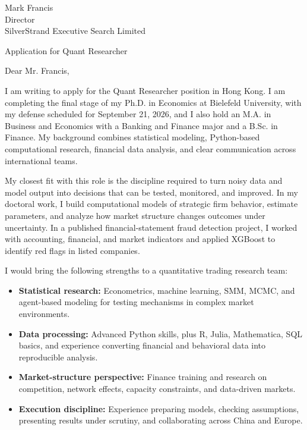\documentclass[11pt]{article}
\begin{document}
\vspace{0.1cm}

\noindent
Mark Francis \\
Director \\
SilverStrand Executive Search Limited \\

\vspace{0.1cm}

\noindent
Application for Quant Researcher \\

\vspace{0.05cm}

\noindent Dear Mr. Francis,

I am writing to apply for the Quant Researcher position in Hong Kong. I am completing the final stage of my Ph.D. in Economics at Bielefeld University, with my defense scheduled for September 21, 2026, and I also hold an M.A. in Business and Economics with a Banking and Finance major and a B.Sc. in Finance. My background combines statistical modeling, Python-based computational research, financial data analysis, and clear communication across international teams.

My closest fit with this role is the discipline required to turn noisy data and model output into decisions that can be tested, monitored, and improved. In my doctoral work, I build computational models of strategic firm behavior, estimate parameters, and analyze how market structure changes outcomes under uncertainty. In a published financial-statement fraud detection project, I worked with accounting, financial, and market indicators and applied XGBoost to identify red flags in listed companies.

I would bring the following strengths to a quantitative trading research team:

\begin{itemize}
    \item \textbf{Statistical research:} Econometrics, machine learning, SMM, MCMC, and agent-based modeling for testing mechanisms in complex market environments.
    \item \textbf{Data processing:} Advanced Python skills, plus R, Julia, Mathematica, SQL basics, and experience converting financial and behavioral data into reproducible analysis.
    \item \textbf{Market-structure perspective:} Finance training and research on competition, network effects, capacity constraints, and data-driven markets.
    \item \textbf{Execution discipline:} Experience preparing models, checking assumptions, presenting results under scrutiny, and collaborating across China and Europe.
\end{itemize}
\end{document}
